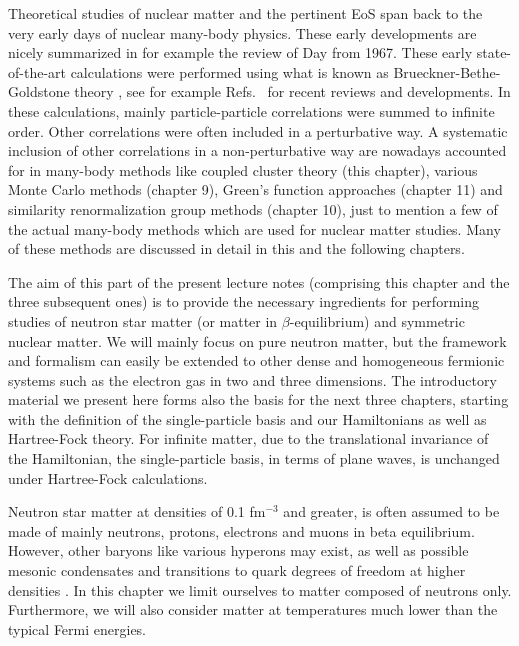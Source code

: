 Theoretical studies of nuclear matter and the pertinent EoS span back
to the very early days of nuclear many-body physics. These early
developments are nicely summarized in for example the review of Day
\cite{day1967} from 1967. These early state-of-the-art calculations
were performed using what is known as Brueckner-Bethe-Goldstone theory
\cite{brueckner1954,brueckner1955}, see for example
Refs.~\cite{hh2000,baldo2012,baldo2012a,coraggio2013,coraggio2014,sammarruca2015} for recent reviews and
developments.  In these calculations, mainly particle-particle
correlations were summed to infinite order.  Other correlations were
often included in a perturbative way. A systematic inclusion of other
correlations in a non-perturbative way are nowadays accounted for in
many-body methods like coupled cluster theory
\cite{bartlett2007,shavittbartlett2009,baardsen2013,hagenmatter,Hagen:2015yea,hagen2016,binder2013,jansen2016} (this chapter), various Monte Carlo methods
\cite{carlson2003,gandolfi2009,gandolfi2009b,gezerlis2010,gandolfi2012,lovato2012,gezerlis2013,carlson2016} (chapter 9), Green's function approaches
\cite{baldo2012a,carbone2013,ch11_Soma2014s2n,dickhoff2004} (chapter 11) and similarity renormalization group methods \cite{morris2015,hergert2016} (chapter 10), just to mention a few of the actual
many-body methods which are used for nuclear matter studies. Many of these methods
are discussed in detail in this and the following chapters.


The aim of this part of the present lecture notes (comprising this chapter and the
three subsequent ones) is to provide the necessary ingredients for
performing studies of neutron star matter (or matter in
$\beta$-equilibrium) and symmetric nuclear matter.  We will mainly
focus on pure neutron matter, but the framework and formalism can
easily be extended to other dense and homogeneous fermionic systems
such as the electron gas in two and three dimensions. The introductory
material we present here forms also the basis for the next three
chapters, starting with the definition of the single-particle basis
and our Hamiltonians as well as Hartree-Fock theory. For infinite
matter, due to the translational invariance of the Hamiltonian, the
single-particle basis, in terms of plane waves, is unchanged under
Hartree-Fock calculations.

Neutron star matter at densities of 0.1 fm$^{-3}$ and greater, is
often assumed to be made of mainly neutrons, protons, electrons and
muons in beta equilibrium. However, other baryons like various
hyperons may exist, as well as possible mesonic condensates and
transitions to quark degrees of freedom at higher densities
\cite{hh2000,Lattimer2007,prakash1996,steiner2010}.  In this chapter we limit ourselves to matter composed
of neutrons only.  Furthermore, we will also consider matter at
temperatures much lower than the typical Fermi energies.

